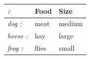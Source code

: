 \documentclass{article}
\begin{document}
 \begin{tabular}{>{\itshape}l<{:} *{2}{l}}
 \toprule
 \multicolumn{1}{l}{Animal} & Food & Size \\
 \midrule
 dog
 & meat & medium \\
 horse & hay & large \\
 frog & flies & small \\
 \bottomrule
 \end{tabular}
 
\end{document}
